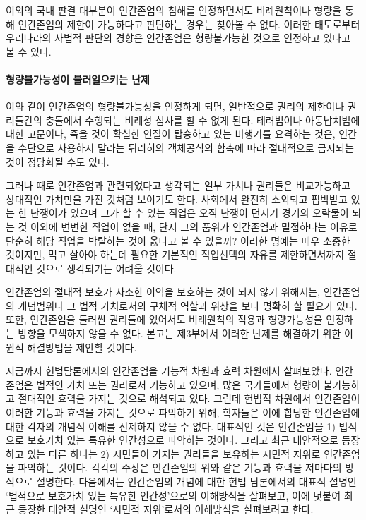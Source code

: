 이외의 국내 판결 대부분이 인간존엄의 침해를 인정하면서도 비례원칙이나 형량을 통해 인간존엄의 제한이 가능하다고 판단하는 경우는 찾아볼 수 없다. 이러한 태도로부터 우리나라의 사법적 판단의 경향은 인간존엄은 형량불가능한 것으로 인정하고 있다고 볼 수 있다.

\paragraph{형량불가능성이 불러일으키는 난제}

이와 같이 인간존엄의 형량불가능성을 인정하게 되면, 일반적으로 권리의 제한이나 권리들간의 충돌에서 수행되는 비례성 심사를 할 수 없게 된다. 테러범이나 아동납치범에 대한 고문이나, 죽을 것이 확실한 인질이 탑승하고 있는 비행기를 요격하는 것은, 인간을 수단으로 사용하지 말라는 뒤리히의 객체공식의 함축에 따라 절대적으로 금지되는 것이 정당화될 수도 있다.

그러나 때로 인간존엄과 관련되었다고 생각되는 일부 가치나 권리들은 비교가능하고 상대적인 가치만을 가진 것처럼 보이기도 한다. 사회에서 완전히 소외되고 핍박받고 있는 한 난쟁이가 있으며 그가 할 수 있는 직업은 오직 난쟁이 던지기 경기의 오락물이 되는 것 이외에 변변한 직업이 없을 때, 단지 그의 품위가 인간존엄과 밀접하다는 이유로 단순히 해당 직업을 박탈하는 것이 옳다고 볼 수 있을까? 이러한 명예는 매우 소중한 것이지만, 먹고 살아야 하는데 필요한 기본적인 직업선택의 자유를 제한하면서까지 절대적인 것으로 생각되기는 어려울 것이다.

인간존엄의 절대적 보호가 사소한 이익을 보호하는 것이 되지 않기 위해서는, 인간존엄의 개념범위나 그 법적 가치로서의 구체적 역할과 위상을 보다 명확히 할 필요가 있다. 또한, 인간존엄을 둘러싼 권리들에 있어서도 비례원칙의 적용과 형량가능성을 인정하는 방향을 모색하지 않을 수 없다. 본고는 제3부에서 이러한 난제를 해결하기 위한 이원적 해결방법을 제안할 것이다.

지금까지 헌법담론에서의 인간존엄을 기능적 차원과 효력 차원에서 살펴보았다. 인간존엄은 법적인 가치 또는 권리로서 기능하고 있으며, 많은 국가들에서 형량이 불가능하고 절대적인 효력을 가지는 것으로 해석되고 있다. 그런데 헌법적 차원에서 인간존엄이 이러한 기능과 효력을 가지는 것으로 파악하기 위해, 학자들은 이에 합당한 인간존엄에 대한 각자의 개념적 이해를 전제하지 않을 수 없다. 대표적인 것은 인간존엄을 1) 법적으로 보호가치 있는 특유한 인간성으로 파악하는 것이다. 그리고 최근 대안적으로 등장하고 있는 다른 하나는 2) 시민들이 가지는 권리들을 보유하는 시민적 지위로 인간존엄을 파악하는 것이다. 각각의 주장은 인간존엄의 위와 같은 기능과 효력을 저마다의 방식으로 설명한다. 다음에서는 인간존엄의 개념에 대한 헌법 담론에서의 대표적 설명인 `법적으로 보호가치 있는 특유한 인간성'으로의 이해방식을 살펴보고, 이에 덧붙여 최근 등장한 대안적 설명인 `시민적 지위'로서의 이해방식을 살펴보려고 한다.

